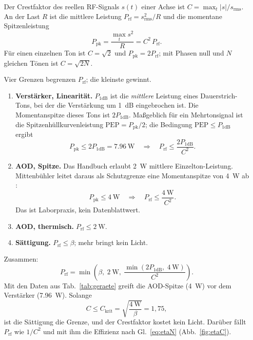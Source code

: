 \documentclass[11pt,a4paper]{article}
\newcommand{\Pone}{P_{\mathrm{1dB}}}
\newcommand{\Prf}{P_{\mathrm{rf}}}
\newcommand{\Ppk}{P_{\mathrm{pk}}}
\newcommand{\Ckrit}{C_{\mathrm{krit}}}
\begin{document}
Der Crestfaktor des reellen RF-Signals $s(t)$ einer Achse ist
$C=\max_t|s|/s_\mathrm{rms}$. An der Last $R$ ist die mittlere Leistung
$\Prf=s_\mathrm{rms}^2/R$ und die momentane Spitzenleistung
\begin{equation}
  \Ppk = \frac{\max_t s^2}{R} = C^2\,\Prf .
  \label{eq:ppk}
\end{equation}
Für einen einzelnen Ton ist $C=\sqrt2$ und $\Ppk=2\Prf$; mit Phasen null und
$N$ gleichen Tönen ist $C=\sqrt{2N}$.

Vier Grenzen begrenzen $\Prf$; die kleinste gewinnt.

\begin{enumerate}
\item \textbf{Verstärker, Linearität.} $\Pone$ ist die \emph{mittlere} Leistung
  eines Dauerstrich-Tons, bei der die Verstärkung um \SI{1}{\deci\bel} eingebrochen
  ist. Die Momentanspitze dieses Tons ist $2\Pone$. Maßgeblich für ein
  Mehrtonsignal ist die Spitzenhüllkurvenleistung
  $\mathrm{PEP}=\Ppk/2$; die Bedingung $\mathrm{PEP}\le\Pone$ ergibt
  \begin{equation}
    \Ppk \le 2\Pone = \SI{7,96}{\watt}
    \quad\Longrightarrow\quad
    \Prf \le \frac{2\Pone}{C^2}.
    \label{eq:amp}
  \end{equation}
\item \textbf{AOD, Spitze.} Das Handbuch erlaubt \SI{2}{\watt} mittlere
  Einzelton-Leistung. Mittenbühler leitet daraus als Schutzgrenze eine
  Momentanspitze von \SI{4}{\watt} ab \cite[Abschn.~3.3]{mittenbuehler}:
  \begin{equation}
    \Ppk \le \SI{4}{\watt}
    \quad\Longrightarrow\quad
    \Prf \le \frac{\SI{4}{\watt}}{C^2}.
    \label{eq:aodpk}
  \end{equation}
  Das ist Laborpraxis, kein Datenblattwert.
\item \textbf{AOD, thermisch.} $\Prf\le\SI{2}{\watt}$.
\item \textbf{Sättigung.} $\Prf\le\beta$; mehr bringt kein Licht.
\end{enumerate}
Zusammen:
\begin{equation}
  \Prf = \min\!\left(\beta,\; \SI{2}{\watt},\; \frac{\min(2\Pone,\;\SI{4}{\watt})}{C^2}\right).
  \label{eq:prf}
\end{equation}
Mit den Daten aus Tab.~\ref{tab:geraete} greift die AOD-Spitze (\SI{4}{\watt})
vor dem Verstärker (\SI{7,96}{\watt}). Solange
\begin{equation}
  C \le \Ckrit = \sqrt{\frac{\SI{4}{\watt}}{\beta}} = 1{,}75,
  \label{eq:ckrit}
\end{equation}
ist die Sättigung die Grenze, und der Crestfaktor kostet kein Licht. Darüber
fällt $\Prf$ wie $1/C^2$ und mit ihm die Effizienz nach Gl.~\eqref{eq:etaN}
(Abb.~\ref{fig:etaC}).
\end{document}
